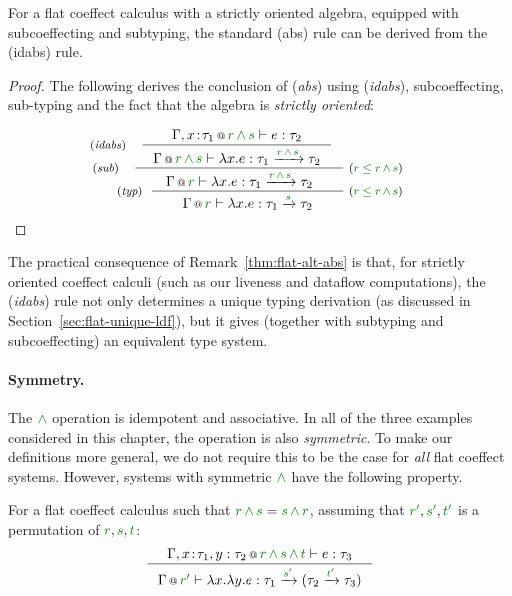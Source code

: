 \begin{remark}
\label{thm:flat-alt-abs}
For a flat coeffect calculus with a strictly oriented algebra, equipped with subcoeffecting and
subtyping, the standard (abs) rule can be derived from the (idabs) rule.
\end{remark}
\begin{proof}
The following derives the conclusion of (\emph{abs}) using (\emph{idabs}), subcoeffecting,
sub-typing and the fact that the algebra is \emph{strictly oriented}:

\begin{equation*}
\tyrule{typ}
  {\hspace{-5em} \tyrule{sub}
     {\hspace{-4em} \tyrule{idabs}
        {\coctx{\Gamma, x\!:\!\tau_1}{\cclrd{r} \,\czip\, \cclrd{s}} \vdash e : \tau_2}
        {\coctx{\Gamma}{\cclrd{r} \,\czip\, \cclrd{s}} \vdash \lambda x.e : \tau_1 \xrightarrow{\cclrd{r} \,\czip\, \cclrd{s}} \tau_2 } }
     {\coctx{\Gamma}{\cclrd{r}} \vdash \lambda x.e : \tau_1 \xrightarrow{\cclrd{r} \,\czip\, \cclrd{s}} \tau_2} \;
           \textnormal{\footnotesize{($\cclrd{r} \;\cleq\; \cclrd{r} \,\czip\, \cclrd{s}$)}} \hspace{-5em} }
  {\coctx{\Gamma}{\cclrd{r}} \vdash \lambda x.e : \tau_1 \xrightarrow{\cclrd{s}} \tau_2} \;
           \textnormal{\footnotesize{($\cclrd{r} \;\cleq\; \cclrd{r} \,\czip\, \cclrd{s}$)}}
\end{equation*}
\end{proof}

\noindent
The practical consequence of Remark~\ref{thm:flat-alt-abs} is that, for strictly
oriented coeffect calculi (such as our liveness and dataflow computations), the (\emph{idabs})
rule not only determines a unique typing derivation (as discussed in Section~\ref{sec:flat-unique-ldf}),
but it gives (together with subtyping and subcoeffecting) an equivalent type system.

\paragraph{Symmetry.}
The $\czip$ operation is idempotent and associative. In all of the three examples considered in
this chapter, the operation is also \emph{symmetric}. To make our definitions more general, we
do not require this to be the case for \emph{all} flat coeffect systems. However, systems with
symmetric $\czip$ have the following property.

\begin{remark}
For a flat coeffect calculus such that $\cclrd{r}\,\czip\,\cclrd{s} = \cclrd{s}\,\czip\,\cclrd{r}$,
assuming that $\cclrd{r'}, \cclrd{s'}, \cclrd{t'}$ is a permutation of $\cclrd{r},\cclrd{s},\cclrd{t}$:
%
\begin{equation*}
\inference
  {\coctx{\Gamma, x\!:\!\tau_1, y:\tau_2}{\cclrd{r} \,\czip\, \cclrd{s} \,\czip\, \cclrd{t}} \vdash e : \tau_3}
  {\coctx{\Gamma}{\cclrd{r'}} \vdash \lambda x.\lambda y.e :
      \tau_1 \xrightarrow{\cclrd{s'}} (\tau_2 \xrightarrow{\cclrd{t'}} \tau_3) }
\end{equation*}
\end{remark}

